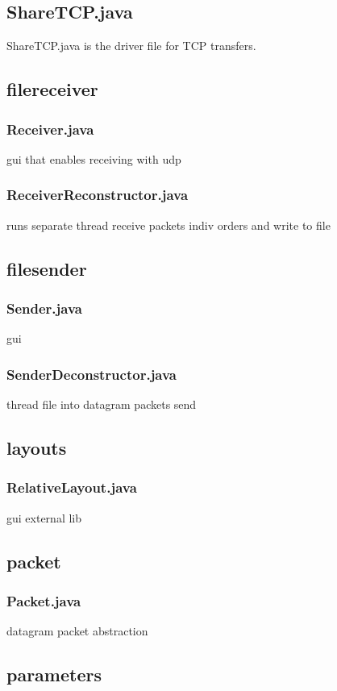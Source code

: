 \documentclass[a4paper,10pt]{article}
\begin{document}
\subsection{ShareTCP.java}
ShareTCP.java is the driver file for TCP transfers.

\subsection{filereceiver}
\subsubsection{Receiver.java}
gui that enables receiving with udp
\subsubsection{ReceiverReconstructor.java}
runs separate thread receive packets indiv orders and write to file

\subsection{filesender}
\subsubsection{Sender.java}
gui
\subsubsection{SenderDeconstructor.java}
thread file into datagram packets send

\subsection{layouts}
\subsubsection{RelativeLayout.java}
gui external lib

\subsection{packet}
\subsubsection{Packet.java}
datagram packet abstraction

\subsection{parameters}
\end{document}
